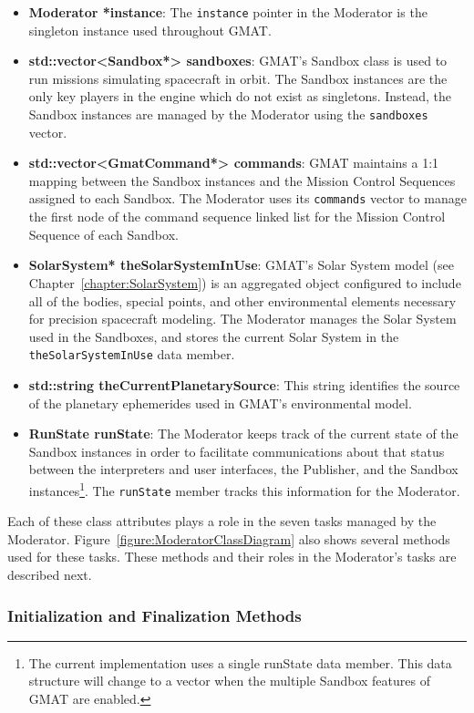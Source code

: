 \begin{itemize}
\item \textbf{Moderator *instance}:  The \texttt{instance} pointer in the Moderator is the
singleton instance used throughout GMAT.
\item \textbf{std::vector<Sandbox*> sandboxes}:  GMAT's Sandbox class is used to run missions
simulating spacecraft in orbit.  The Sandbox instances are the only key players in the engine which
do not exist as singletons.  Instead, the Sandbox instances are managed by the Moderator using the
\texttt{sandboxes} vector.
\item \textbf{std::vector<GmatCommand*> commands}:  GMAT maintains a 1:1 mapping between the
Sandbox instances and the Mission Control Sequences assigned to each Sandbox.  The Moderator uses
its \texttt{commands} vector to manage the first node of the command sequence linked list for
the Mission Control Sequence of each Sandbox.
\item \textbf{SolarSystem* theSolarSystemInUse}:  GMAT's Solar System model (see
Chapter~\ref{chapter:SolarSystem}) is an aggregated object configured to include all of the bodies,
special points, and other environmental elements necessary for precision spacecraft modeling.  The
Moderator manages the Solar System used in the Sandboxes, and stores the current Solar System in
the \texttt{theSolarSystemInUse} data member.
\item \textbf{std::string theCurrentPlanetarySource}:  This string identifies the source of the
planetary ephemerides used in GMAT's environmental model.
\item \textbf{RunState runState}:  The Moderator keeps track of the current state of the Sandbox
instances in order to facilitate communications about that status between the interpreters and user
interfaces, the Publisher, and the Sandbox instances\footnote{The current implementation uses a
single runState data member.  This data structure will change to a vector when the multiple
Sandbox features of GMAT are enabled.}. The \texttt{runState} member tracks this information for the
Moderator.
\end{itemize}

Each of these class attributes plays a role in the seven tasks managed by the Moderator.
Figure~\ref{figure:ModeratorClassDiagram} also shows several methods used for these tasks.  These
methods and their roles in the Moderator's tasks are described next.

\subsubsection{Initialization and Finalization Methods}

